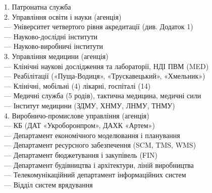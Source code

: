 1. Патронатна служба \\
2. Управління освіти і науки (агенція) \\
\hspace*{0.25cm}     — Університет четвертого рівня акредитації (див. Додаток 1) \\
\hspace*{0.25cm}     — Науково-дослідні інститути \\
\hspace*{0.25cm}     — Науково-виробничі інститути \\
3. Управління медицини (агенція) \\
\hspace*{0.25cm}     — Клінічні наукові дослідження та лабораторії, НДІ ПВМ (MED) \\
\hspace*{0.25cm}     — Реабілітації («Пуща-Водиця», «Трускавецький», «Хмельник») \\
\hspace*{0.25cm}     — Клінічні, мобільні (4) лікарні, госпіталі (14) \\
\hspace*{0.25cm}     — Медичні служба (5 родів), тактична медицина, медичні сили \\
\hspace*{0.25cm}     — Інститут медицини (ЗДМУ, ХНМУ, ЛНМУ, ТНМУ) \\
4. Виробничо-промислове управління (агенція) \\
\hspace*{0.25cm}     — КБ (ДАТ «Укроборонпром», ДАХК «Артем») \\
\hspace*{0.25cm}     — Департамент економічного моделювання і планування \\
\hspace*{0.25cm}     — Департамент ресурсного забезпечення (SCM, TMS, WMS) \\
\hspace*{0.25cm}     — Департамент бюджетування і закупівель (FIN) \\
\hspace*{0.25cm}     — Департамент будівництва і архітектури, ліній виробництва \\
\hspace*{0.25cm}     — Телекомунікаційний департамент інформаційних систем \\
\hspace*{0.7cm}         — Відділ систем врядування \\
